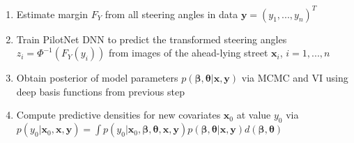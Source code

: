 \documentclass[preview]{standalone}
\begin{document}
\begin{center}
\selectfont
        \begin{enumerate}
        \item Estimate margin $F_Y$ from all steering angles in data $\boldsymbol{y}= (y_1,...,y_n)^T$
        \item Train PilotNet DNN to predict the transformed steering angles $z_i = \Phi^{-1}(F_Y(y_i))$ from images of the ahead-lying street $\boldsymbol{x}_i$, $i = 1,...,n$
        \item Obtain posterior of model parameters $p(\boldsymbol{\beta}, \boldsymbol{\theta}|  \boldsymbol{x}, \boldsymbol{y})$ via MCMC and VI using deep basis functions from previous step
        \item Compute predictive densities for new covariates $\boldsymbol{x}_0$ at value $y_0$ via $p(y_0 | \boldsymbol{x}_0, \boldsymbol{x}, \boldsymbol{y}) = \int p(y_0 | \boldsymbol{x}_0, \boldsymbol{\beta}, \boldsymbol{\theta}, \boldsymbol{x}, \boldsymbol{y})p(\boldsymbol{\beta}, \boldsymbol{\theta}| \boldsymbol{x}, \boldsymbol{y})d(\boldsymbol{\beta}, \boldsymbol{\theta})$
        \end{enumerate}
\end{center}
\end{document}
